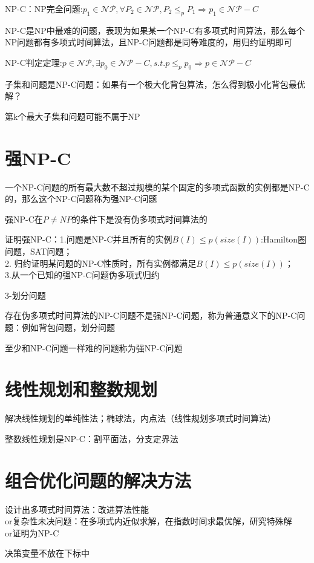 \documentclass[12pt, a4paper, oneside]{ctexart}
\begin{document}
NP-C：NP完全问题:$p_1\in\mathcal{NP},\forall P_2\in\mathcal{NP},P_2\leq _pP_1\Rightarrow p_1\in\mathcal{NP}-C$

NP-C是NP中最难的问题，表现为如果某一个NP-C有多项式时间算法，那么每个NP问题都有多项式时间算法，且NP-C问题都是同等难度的，用归约证明即可

NP-C判定定理:$p\in\mathcal{NP},\exists p_0\in\mathcal{NP-}C,s.t.p\leq _pp_0\Rightarrow p\in\mathcal{NP}-C$

子集和问题是NP-C问题：如果有一个极大化背包算法，怎么得到极小化背包最优解？

第k个最大子集和问题可能不属于NP

\section*{强NP-C}
一个NP-C问题的所有最大数不超过规模的某个固定的多项式函数的实例都是NP-C的，那么这个NP-C问题称为强NP-C问题

强NP-C在$P\neq NP$的条件下是没有伪多项式时间算法的

证明强NP-C：1.问题是NP-C并且所有的实例$B(I)\leq p(size(I))$:Hamilton圈问题，SAT问题； \\
2. 归约证明某问题的NP-C性质时，所有实例都满足$B(I)\leq p(size(I))$；\\
3.从一个已知的强NP-C问题伪多项式归约

3-划分问题

存在伪多项式时间算法的NP-C问题不是强NP-C问题，称为普通意义下的NP-C问题：例如背包问题，划分问题

至少和NP-C问题一样难的问题称为强NP-C问题


\section*{线性规划和整数规划}

解决线性规划的单纯性法；椭球法，内点法（线性规划多项式时间算法）

整数线性规划是NP-C：割平面法，分支定界法

\section*{组合优化问题的解决方法}
设计出多项式时间算法：改进算法性能\\
or复杂性未决问题：在多项式内近似求解，在指数时间求最优解，研究特殊解\\
or证明为NP-C

决策变量不放在下标中

























% 
% 
\end{document}
